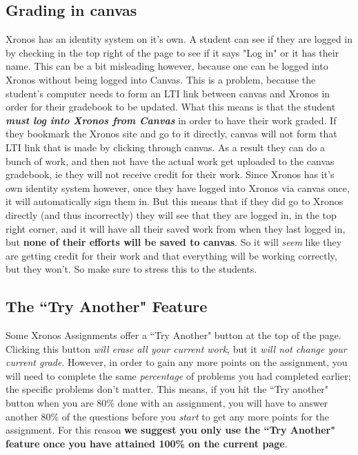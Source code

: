 \documentclass{article}
\begin{document}
\subsection{Grading in canvas}
Xronos has an identity system on it's own. A student can see if they are logged in by checking in the top right of the page to see if it says "Log in" or it has their name. This can be a bit misleading however, because one can be logged into Xronos without being logged into Canvas. This is a problem, because the student's computer needs to form an LTI link between canvas and Xronos in order for their gradebook to be updated. What this means is that the student \textit{\textbf{must log into Xronos from Canvas}} in order to have their work graded. If they bookmark the Xronos site and go to it directly, canvas will not form that LTI link that is made by clicking through canvas. As a result they can do a bunch of work, and then not have the actual work get uploaded to the canvas gradebook, ie they will not receive credit for their work.
Since Xronos has it's own identity system however, once they have logged into Xronos via canvas once, it will automatically sign them in. But this means that if they did go to Xronos directly (and thus incorrectly) they will see that they are logged in, in the top right corner, and it will have all their saved work from when they last logged in, but \textbf{none of their efforts will be saved to canvas}. So it will \textit{seem} like they are getting credit for their work and that everything will be working correctly, but they won't. So make sure to stress this to the students.

\subsection{The ``Try Another" Feature}
Some Xronos Assignments offer a ``Try Another" button at the top of the page. Clicking this button \textit{will erase all your current work}, but it \textit{will not change your current grade}. However, in order to gain any more points on the assignment, you will need to complete the same \textit{percentage} of problems you had completed earlier; the specific problems don't matter. This means, if you hit the ``Try another" button when you are 80\% done with an assignment, you will have to answer another 80\% of the questions before you \textit{start} to get any more points for the assignment. For this reason \textbf{we suggest you only use the ``Try Another" feature once you have attained 100\% on the current page}.
\end{document}
